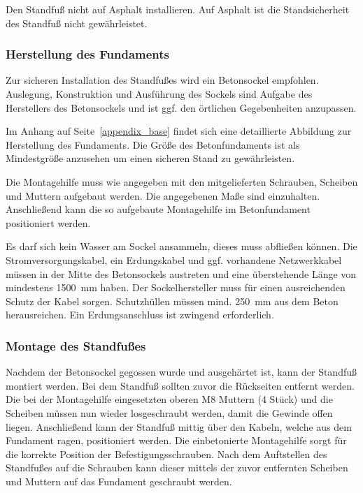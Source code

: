 \documentclass[a4paper,10pt]{article}
\newcommand{\hint}[1]{\begin{tcolorbox}[colback=boxgray,colframe=black,coltext=
white,title=Hinweis]#1\end{tcolorbox}}
\begin{document}
\begin{multicols*}{2}
    \hint{Den Standfuß nicht auf Asphalt installieren. Auf Asphalt ist die
	Standsicherheit des Standfuß nicht gewährleistet.}


	\subsubsection{Herstellung des Fundaments}
    Zur sicheren Installation des Standfußes wird ein Betonsockel empfohlen.
	Auslegung, Konstruktion und Ausführung des Sockels sind Aufgabe des 
	Herstellers des Betonsockels und ist ggf. den örtlichen Gegebenheiten
	anzupassen.
	\par
	Im Anhang auf Seite~\ref{appendix_base} findet sich eine detaillierte
	Abbildung zur Herstellung des Fundaments. Die Größe des Betonfundaments ist als
	Mindestgröße anzusehen um einen sicheren Stand zu gewährleisten.
	\par
	Die Montagehilfe muss wie angegeben mit den mitgelieferten Schrauben,
	Scheiben und Muttern aufgebaut werden. Die angegebenen Maße sind
	einzuhalten. Anschließend kann die so aufgebaute Montagehilfe im 
	Betonfundament positioniert werden.
	\par
	Es darf sich kein Wasser am Sockel ansammeln, dieses muss abfließen können. Die 
	Stromversorgungskabel, ein Erdungskabel und ggf. vorhandene Netzwerkkabel müssen in der Mitte 
	des Betonsockels austreten und eine überstehende Länge von mindestens
	\SI{1500}{\milli\meter} haben. Der Sockelhersteller muss
	für einen ausreichenden Schutz der Kabel sorgen. Schutzhüllen müssen mind.
	\SI{250}{\milli\meter} aus dem Beton herausreichen. Ein Erdungsanschluss ist
	zwingend erforderlich.

	\subsubsection{Montage des Standfußes}
	Nachdem der Betonsockel gegossen wurde und ausgehärtet ist, kann
	der Standfuß montiert werden. Bei dem Standfuß sollten zuvor die Rückseiten 
	entfernt werden. Die bei der Montagehilfe
	eingesetzten oberen M8 Muttern (4 Stück) und die Scheiben müssen nun wieder losgeschraubt werden, 
	damit die Gewinde offen liegen. Anschließend kann der Standfuß mittig über den
	Kabeln, welche aus dem Fundament ragen, positioniert werden. Die
	einbetonierte Montagehilfe sorgt für die korrekte Position der
	Befestigungsschrauben. Nach dem Auftstellen des Standfußes auf die Schrauben kann dieser
	mittels der zuvor entfernten Scheiben und Muttern auf das Fundament
	geschraubt werden.


\end{multicols*}
\end{document}

